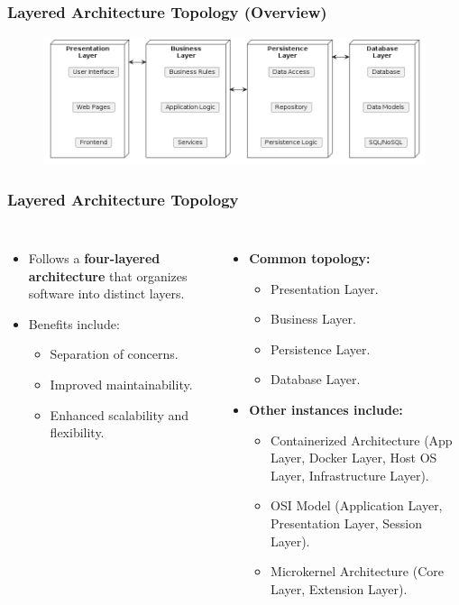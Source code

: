 \documentclass[aspectratio=169, table]{beamer}
\begin{document}
\begin{frame}
	\frametitle{Layered Architecture Topology (Overview)}
	\begin{figure}[ht]
		\centering
		\includegraphics[width=\textwidth]{../../images/out/layered_architecture.png}

		\label{fig:layered_architecture}
	\end{figure}
\end{frame}

\begin{frame}
	\frametitle{Layered Architecture Topology}
	\begin{columns}[t]
		\begin{itemize}
			\item Follows a \textbf{four-layered architecture} that organizes software into distinct layers.
			\item Benefits include:
			\begin{itemize}
				\item Separation of concerns.
				\item Improved maintainability.
				\item Enhanced scalability and flexibility.
			\end{itemize}
		\end{itemize}
		\begin{itemize}
			\item \textbf{Common topology:}
			\begin{itemize}
				\item Presentation Layer.
				\item Business Layer.
				\item Persistence Layer.
				\item Database Layer.
			\end{itemize}
			\item \textbf{Other instances include:}
			\begin{itemize}
				\item Containerized Architecture (App Layer, Docker Layer, Host OS Layer, Infrastructure Layer).
				\item OSI Model (Application Layer, Presentation Layer, Session Layer).
				\item Microkernel Architecture (Core Layer, Extension Layer).
			\end{itemize}
		\end{itemize}
	\end{columns}
\end{frame}
\end{document}

